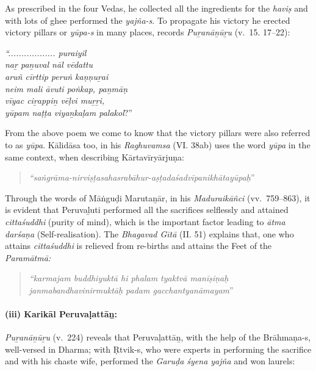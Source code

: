 As prescribed in the four Vedas, he collected all the ingredients for the \textit{haviṣ} and with lots of ghee performed the \textit{yajña-s}. To propagate his victory he erected victory pillars or \textit{yūpa-s} in many places, records \textit{Puṟanāṉūṟu} (v.~15. 17–22):

\textit{“.................. puraiyil}\\\textit{naṟ paṉuval nāl vēdattu}\\\textit{aruñ cīrttip peruṅ kaṇṇuṟai}\\\textit{neim mali āvuti poṅkap, paṉmāṇ}\\\textit{vīyac ciṟappiṉ vēḷvi muṟṟi,}\\\textit{yūpam naṭṭa viyaṉkaḷam palakol}?”

From the above poem we come to know that the victory pillars were also referred to as \textit{yūpa}. Kālidāsa too, in his \textit{Raghuvamsa} (VI. 38ab) uses the word \textit{yūpa} in the same context, when describing Kārtavīryārjuṇa:

\begin{quote}
\textit{“saṅgrāma-nirviṣṭasahasrabāhur-aṣṭadaśadvīpanikhātayūpaḥ}” 
\end{quote}

Through the words of Māṅguḍi Marutaṉār, in his \textit{Maduraikāñci} (vv.~759–863), it is evident that Peruvaḻuti performed all the sacrifices selflessly and attained \textit{cittaśuddhi} (purity of mind), which is the important factor leading to \textit{ātma darśaṇa} (Self-realisation). The \textit{Bhagavad Gītā} (II. 51) explains that, one who attains \textit{cittaśuddhi} is relieved from re-births and attains the Feet of the \textit{Paramātmā:}

\begin{quote}
\textit{“karmajam buddhiyuktā hi phalam tyaktvā manīṣiṇaḥ}\\\textit{janmabandhavinirmuktāḥ padam gacchantyanāmayam}”
\end{quote}


\paragraph*{(iii) Karikāl Peruvaḷattāṉ:}

\vskip -7pt

\textit{Puṟanāṉūṟu} (v.~224) reveals that Peruvaḷattāṉ, with the help of the Brāhmaṇa-s, well-versed in Dharma; with Ṛtvik-s, who were experts in performing the sacrifice and with his chaste wife, performed the \textit{Garuḍa śyena yajña} and won laurels:

